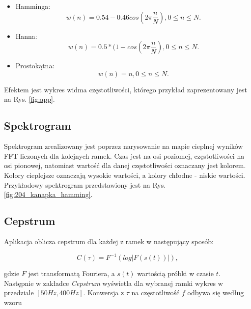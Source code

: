 \documentclass[12pt,a4paper]{article}
\begin{document}
        \begin{itemize}
            \item
                Hamminga:
                \begin{equation*}
                    w(n)=0.54-0.46cos(2\pi\frac{n}{N}), 0 \leq n \leq N.
                \end{equation*}
            \item
                Hanna:
                \begin{equation*}
                    w(n)= 0.5*(1-cos(2\pi\frac{n}{N}), 0 \leq n \leq N.
                \end{equation*}
            \item
                Prostokątna:
                \begin{equation*}
                    w(n)=n,  0 \leq n \leq N.
                \end{equation*}
        \end{itemize}

        Efektem jest wykres widma częstotliwości, którego przykład zaprezentowany jest na Rys. \ref{fig:app}.

    \subsection{Spektrogram\label{sec:spektro}}
        Spektrogram zrealizowany jest poprzez narysowanie na mapie cieplnej wyników FFT liczonych dla kolejnych ramek. Czas jest na osi poziomej, częstotliwości na osi pionowej, natomiast wartość dla danej częstotliwości oznaczany jest kolorem. Kolory cieplejsze oznaczają wysokie wartości, a kolory chłodne - niskie wartości. Przykładowy spektrogram przedstawiony jest na Rys. \ref{fig:204_kanapka_hamming}.


    \subsection{Cepstrum\label{sec:cepstrum}}
        Aplikacja oblicza cepstrum dla każdej z ramek w następujący sposób:

        \begin{equation*}
            C(\tau)=F^{-1}(log|F(s(t))|),
        \end{equation*}

        gdzie $F$ jest transformatą Fouriera, a $s(t)$ wartością próbki w czasie $t$. Następnie w zakładce \emph{Cepstrum} wyświetla dla wybranej ramki wykres w przedziale $[50Hz, 400Hz]$. Konwersja z $\tau$ na częstotliwość $f$ odbywa się według wzoru
\end{document}
